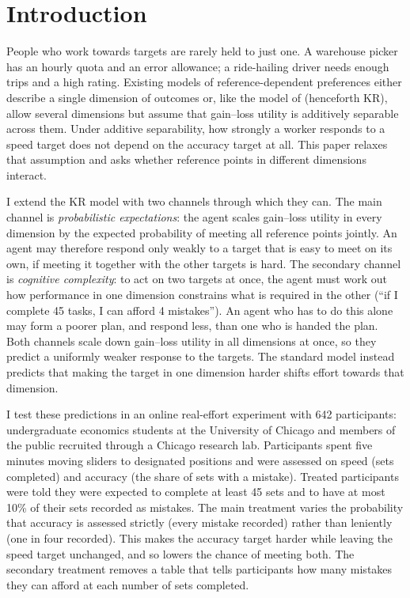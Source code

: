 \documentclass[12pt, letterpaper]{article}
\begin{document}
\section{Introduction}

People who work towards targets are rarely held to just one. A warehouse picker has an hourly quota and an error allowance; a ride-hailing driver needs enough trips and a high rating. Existing models of reference-dependent preferences either describe a single dimension of outcomes or, like the model of \textcite{koszegi.2006.modelreferencedependenta} (henceforth KR), allow several dimensions but assume that gain--loss utility is additively separable across them. Under additive separability, how strongly a worker responds to a speed target does not depend on the accuracy target at all. This paper relaxes that assumption and asks whether reference points in different dimensions interact.

I extend the KR model with two channels through which they can. The main channel is \emph{probabilistic expectations}: the agent scales gain--loss utility in every dimension by the expected probability of meeting all reference points jointly. An agent may therefore respond only weakly to a target that is easy to meet on its own, if meeting it together with the other targets is hard. The secondary channel is \emph{cognitive complexity}: to act on two targets at once, the agent must work out how performance in one dimension constrains what is required in the other (``if I complete 45 tasks, I can afford 4 mistakes''). An agent who has to do this alone may form a poorer plan, and respond less, than one who is handed the plan. Both channels scale down gain--loss utility in all dimensions at once, so they predict a uniformly weaker response to the targets. The standard model instead predicts that making the target in one dimension harder shifts effort towards that dimension.

I test these predictions in an online real-effort experiment with 642 participants: undergraduate economics students at the University of Chicago and members of the public recruited through a Chicago research lab. Participants spent five minutes moving sliders to designated positions and were assessed on speed (sets completed) and accuracy (the share of sets with a mistake). Treated participants were told they were expected to complete at least 45 sets and to have at most 10\% of their sets recorded as mistakes. The main treatment varies the probability that accuracy is assessed strictly (every mistake recorded) rather than leniently (one in four recorded). This makes the accuracy target harder while leaving the speed target unchanged, and so lowers the chance of meeting both. The secondary treatment removes a table that tells participants how many mistakes they can afford at each number of sets completed.
\end{document}
